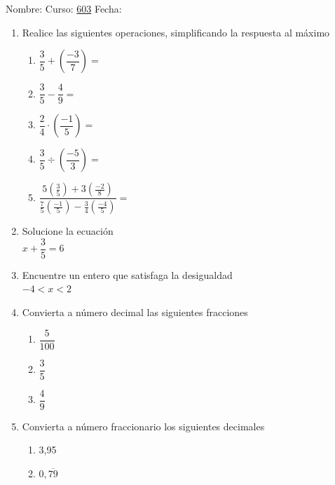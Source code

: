 \documentclass[fleqn]{article}
\newcommand{\LineaNombre}{%
\par
\vspace{\baselineskip}
Nombre:\hrulefill \; Curso: \underline{603} \; Fecha: \underline{\hspace*{2.5cm}} \relax
\par}
\begin{document}
\LineaNombre
\begin{enumerate}
 \item Realice las siguientes operaciones, simplificando la respuesta al máximo
\begin{enumerate}
 \item $\dfrac{3}{5}+\left(\dfrac{-3}{7}\right)=$\noanswer
\item $\dfrac{3}{5}-\dfrac{4}{9}=$\noanswer
\item $\dfrac{2}{4}\cdot\left(\dfrac{-1}{5}\right)=$\noanswer
\item $\dfrac{3}{5}\div\left(\dfrac{-5}{3}\right)=$\noanswer
\item $\dfrac{5\left(\frac{3}{5}\right)+3\left(\frac{-2}{8}\right)}{\frac{7}{5}\left(\frac{-1}{5}\right)-\frac{3}{4}\left(\frac{-4}{5}\right)}=$\noanswer
\end{enumerate}
\item Solucione la ecuación \\$x+\dfrac{3}{5}=6$\\ \vspace{1cm}
\item Encuentre un entero que satisfaga la desigualdad\\$-4<x<2$\\ \vspace{1cm}
\item Convierta a número decimal las siguientes fracciones\\
\begin{enumerate}
 \item $\dfrac{5}{100}$\\ \vspace{0,5cm}
\item $\dfrac{3}{5}$\\ \vspace{0,5cm}
\item $\dfrac{4}{9}$\\ \vspace{0,5cm}
\end{enumerate}
\item Convierta a número fraccionario los siguientes decimales
\begin{enumerate}
\item 3,95\\ \vspace{1cm}
\item $0,\overline{79}$ \\ \vspace{4cm}

\end{enumerate}
\end{enumerate}
\end{document}
